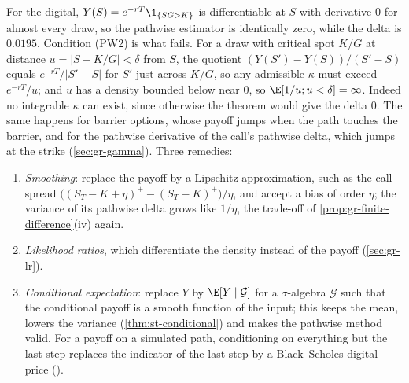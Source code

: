 \begin{remark}\label{rem:gr-digital}
For the digital, $Y(S)=e^{-rT}\1_{\{SG>K\}}$ is differentiable at $S$ with derivative $0$ for
almost every draw, so the pathwise estimator is identically zero, while the delta is
$0.0195$. Condition (PW2) is what fails. For a draw with critical spot $K/G$ at distance
$u=|S-K/G|<\delta$ from $S$, the quotient $(Y(S')-Y(S))/(S'-S)$ equals $e^{-rT}/|S'-S|$ for
$S'$ just across $K/G$, so any admissible $\kappa$ must exceed $e^{-rT}/u$; and $u$ has a
density bounded below near $0$, so $\E[1/u;u<\delta]=\infty$. Indeed no integrable $\kappa$ can
exist, since otherwise the theorem would give the delta $0$. The same happens for barrier
options, whose payoff jumps when the path touches the barrier, and for the pathwise derivative
of the call's pathwise delta, which jumps at the strike (\cref{sec:gr-gamma}). Three remedies:
\begin{enumerate}[label=(\alph*)]
  \item \emph{Smoothing}: replace the payoff by a Lipschitz approximation, such as the call
    spread $\big((S_T-K+\eta)^+-(S_T-K)^+\big)/\eta$, and accept a bias of order $\eta$;
    the variance of its pathwise delta grows like $1/\eta$, the trade-off of
    \cref{prop:gr-finite-difference}(iv) again.
  \item \emph{Likelihood ratios}, which differentiate the density instead of the payoff
    (\cref{sec:gr-lr}).
  \item \emph{Conditional expectation}: replace $Y$ by $\E[Y\mid\mathcal G]$ for a
    $\sigma$-algebra $\mathcal G$ such that the conditional payoff is a smooth function of the
    input; this keeps the mean, lowers the variance (\cref{thm:st-conditional}) and makes the
    pathwise method valid. For a payoff on a simulated path, conditioning on everything but the
    last step replaces the indicator of the last step by a Black--Scholes digital price
    ().
\end{enumerate}
\end{remark}

